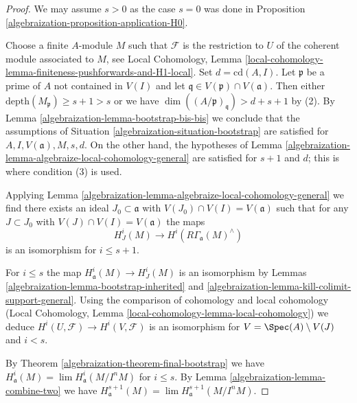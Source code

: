 \begin{proof}

We may assume $s > 0$ as the case $s = 0$ was done in
Proposition \ref{algebraization-proposition-application-H0}.

\medskip\noindent
Choose a finite $A$-module $M$ such that $\mathcal{F}$ is the restriction
to $U$ of the coherent module associated to $M$, see Local Cohomology,
Lemma \ref{local-cohomology-lemma-finiteness-pushforwards-and-H1-local}.
Set $d = \text{cd}(A, I)$.
Let $\mathfrak p$ be a prime of $A$ not contained in $V(I)$
and let $\mathfrak q \in V(\mathfrak p) \cap V(\mathfrak a)$.
Then either $\text{depth}(M_\mathfrak p) \geq s + 1 > s$
or we have $\dim((A/\mathfrak p)_\mathfrak q) > d + s + 1$ by (2).
By Lemma \ref{algebraization-lemma-bootstrap-bis-bis} we conclude that the
assumptions of Situation \ref{algebraization-situation-bootstrap}
are satisfied for $A, I, V(\mathfrak a), M, s, d$.
On the other hand, the hypotheses of
Lemma \ref{algebraization-lemma-algebraize-local-cohomology-general}
are satisfied for $s + 1$ and $d$; this is where condition (3) is used.

\medskip\noindent
Applying Lemma \ref{algebraization-lemma-algebraize-local-cohomology-general}
we find there exists an ideal
$J_0 \subset \mathfrak a$ with $V(J_0) \cap V(I) = V(\mathfrak a)$
such that for any $J \subset J_0$ with $V(J) \cap V(I) = V(\mathfrak a)$
the maps
$$
H^i_J(M) \longrightarrow H^i(R\Gamma_\mathfrak a(M)^\wedge)
$$
is an isomorphism for $i \leq s + 1$.

\medskip\noindent
For $i \leq s$ the map $H^i_\mathfrak a(M) \to H^i_J(M)$
is an isomorphism by Lemmas \ref{algebraization-lemma-bootstrap-inherited} and
\ref{algebraization-lemma-kill-colimit-support-general}.
Using the comparison of cohomology and local cohomology
(Local Cohomology, Lemma \ref{local-cohomology-lemma-local-cohomology})
we deduce
$H^i(U, \mathcal{F}) \to H^i(V,\mathcal{F})$
is an isomorphism for $V = \Spec(A) \setminus V(J)$ and
$i < s$.

\medskip\noindent
By Theorem \ref{algebraization-theorem-final-bootstrap} we have
$H^i_\mathfrak a(M) = \lim H^i_\mathfrak a(M/I^nM)$
for $i \leq s$. By Lemma \ref{algebraization-lemma-combine-two} we have
$H^{s + 1}_\mathfrak a(M) = \lim H^{s + 1}_\mathfrak a(M/I^nM)$.


\end{proof}
